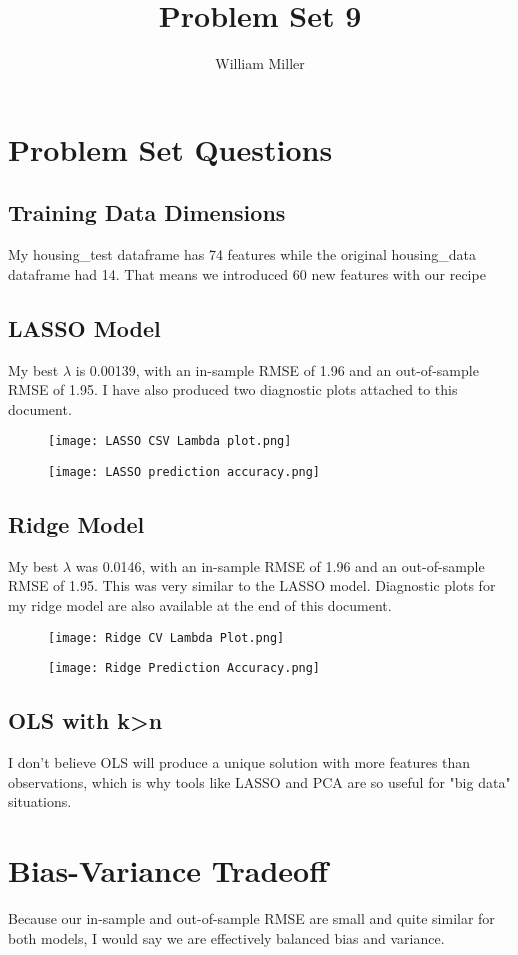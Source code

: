 \documentclass{article}
\title{Problem Set 9}
\author{William Miller}
\begin{document}
\maketitle

\section{Problem Set Questions}

\subsection{Training Data Dimensions}
My housing\_test dataframe has 74 features while the original housing\_data dataframe had 14. That means we introduced 60 new features with our recipe

\subsection{LASSO Model}
My best $\lambda$ is 0.00139, with an in-sample RMSE of 1.96 and an out-of-sample RMSE of 1.95. I have also produced two diagnostic plots attached to this document.

\begin{figure}[htbp]
  \centering
  \texttt{[image: LASSO CSV Lambda plot.png]}
\end{figure}

\begin{figure}[htbp]
  \centering
  \texttt{[image: LASSO prediction accuracy.png]}
\end{figure}

\subsection{Ridge Model}
My best $\lambda$ was 0.0146, with an in-sample RMSE of 1.96 and an out-of-sample RMSE of 1.95. This was very similar to the LASSO model. Diagnostic plots for my ridge model are also available at the end of this document.

\begin{figure}[htbp]
  \centering
  \texttt{[image: Ridge CV Lambda Plot.png]}
\end{figure}

\begin{figure}[htbp]
  \centering
  \texttt{[image: Ridge Prediction Accuracy.png]}
\end{figure}

\subsection{OLS with k>n}
I don't believe OLS will produce a unique solution with more features than observations, which is why tools like LASSO and PCA are so useful for "big data" situations.

\section{Bias-Variance Tradeoff}
Because our in-sample and out-of-sample RMSE are small and quite similar for both models, I would say we are effectively balanced bias and variance.
\end{document}
